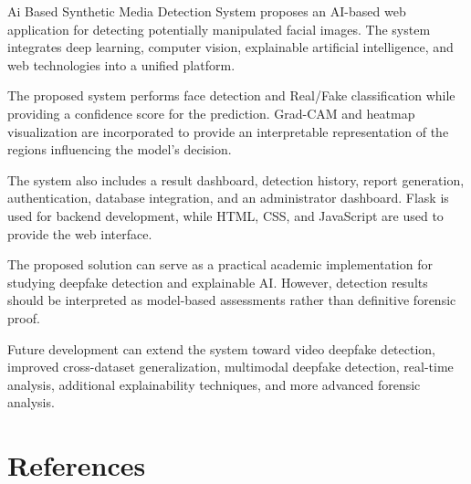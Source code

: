 \documentclass[12pt,a4paper,oneside]{report}
\begin{document}
Ai Based Synthetic Media Detection System proposes an AI-based web application for detecting potentially manipulated facial images. The system integrates deep learning, computer vision, explainable artificial intelligence, and web technologies into a unified platform.

The proposed system performs face detection and Real/Fake classification while providing a confidence score for the prediction. Grad-CAM and heatmap visualization are incorporated to provide an interpretable representation of the regions influencing the model's decision.

The system also includes a result dashboard, detection history, report generation, authentication, database integration, and an administrator dashboard. Flask is used for backend development, while HTML, CSS, and JavaScript are used to provide the web interface.

The proposed solution can serve as a practical academic implementation for studying deepfake detection and explainable AI. However, detection results should be interpreted as model-based assessments rather than definitive forensic proof.

Future development can extend the system toward video deepfake detection, improved cross-dataset generalization, multimodal deepfake detection, real-time analysis, additional explainability techniques, and more advanced forensic analysis.


\chapter*{References}
\end{document}
